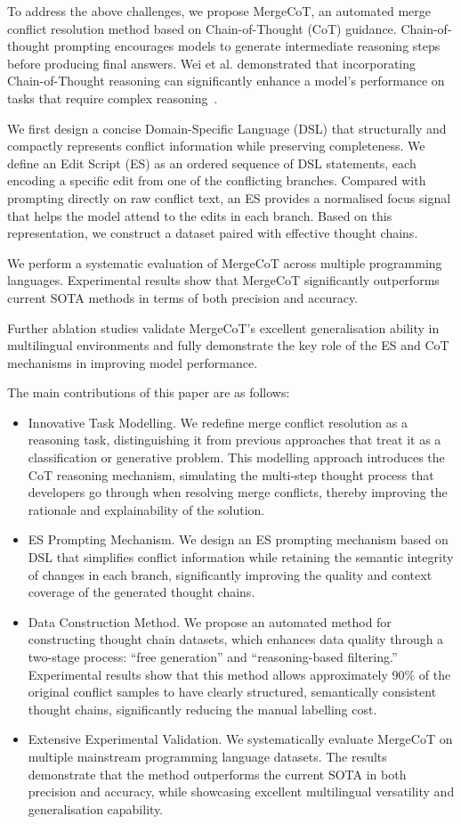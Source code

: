 \documentclass[sigconf,review,anonymous]{acmart}
\begin{document}
To address the above challenges, we propose MergeCoT, an automated merge conflict resolution method based on Chain-of-Thought (CoT) guidance. Chain-of-thought prompting encourages models to generate intermediate reasoning steps before producing final answers. Wei et al. demonstrated that incorporating Chain-of-Thought reasoning can significantly enhance a model’s performance on tasks that require complex reasoning~\cite{cot}.

We first design a concise Domain-Specific Language (DSL) that structurally and compactly represents conflict information while preserving completeness.
We define an Edit Script (ES) as an ordered sequence of DSL statements, each encoding a specific edit from one of the conflicting branches.
Compared with prompting directly on raw conflict text, an ES provides a normalised focus signal that helps the model attend to the edits in each branch. Based on this representation, we construct a dataset paired with effective thought chains.

We perform a systematic evaluation of MergeCoT across multiple programming languages. Experimental results show that MergeCoT significantly outperforms current SOTA methods in terms of both precision and accuracy. 

Further ablation studies validate MergeCoT’s excellent generalisation ability in multilingual environments and fully demonstrate the key role of the ES and CoT mechanisms in improving model performance.
 \medskip
 \noindent

The main contributions of this paper are as follows:
\begin{itemize}
\item Innovative Task Modelling. We redefine merge conflict resolution as a reasoning task, distinguishing it from previous approaches that treat it as a classification or generative problem. This modelling approach introduces the CoT reasoning mechanism, simulating the multi-step thought process that developers go through when resolving merge conflicts, thereby improving the rationale and explainability of the solution.
\item ES Prompting Mechanism. We design an ES prompting mechanism based on DSL that simplifies conflict information while retaining the semantic integrity of changes in each branch, significantly improving the quality and context coverage of the generated thought chains.
\item Data Construction Method. We propose an automated method for constructing thought chain datasets, which enhances data quality through a two-stage process: “free generation” and “reasoning-based filtering.” Experimental results show that this method allows approximately 90\% of the original conflict samples to have clearly structured, semantically consistent thought chains, significantly reducing the manual labelling cost. 
\item Extensive Experimental Validation. We systematically evaluate MergeCoT on multiple mainstream programming language datasets. The results demonstrate that the method outperforms the current SOTA in both precision and accuracy, while showcasing excellent multilingual versatility and generalisation capability.
\end{itemize}
\end{document}
